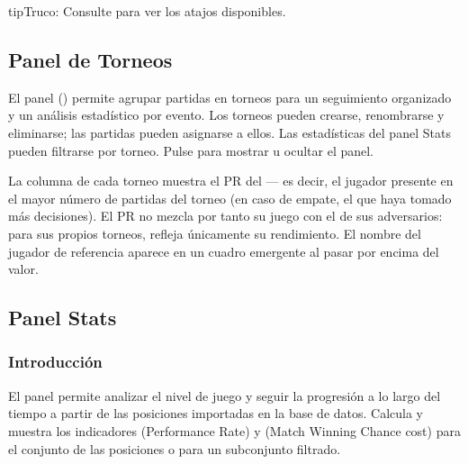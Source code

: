 \documentclass[letterpaper,10pt,spanish]{sphinxmanual}
\begin{document}
\begin{sphinxadmonition}{tip}{Truco:}
\sphinxAtStartPar
Consulte {\hyperref[\detokenize{raccourcis:raccourcis}]{}} para ver los atajos disponibles.
\end{sphinxadmonition}


\subsection{Panel de Torneos}
\label{\detokenize{manuel:panneau-tournois}}\label{\detokenize{manuel:id8}}
\sphinxAtStartPar
El panel  () permite agrupar partidas en torneos para un seguimiento organizado y un análisis estadístico por evento. Los torneos pueden crearse, renombrarse y eliminarse; las partidas pueden asignarse a ellos. Las estadísticas del panel Stats pueden filtrarse por torneo. Pulse  para mostrar u ocultar el panel.

\sphinxAtStartPar
La columna  de cada torneo muestra el PR del  — es decir, el jugador presente en el mayor número de partidas del torneo (en caso de empate, el que haya tomado más decisiones). El PR no mezcla por tanto su juego con el de sus adversarios: para sus propios torneos, refleja únicamente su rendimiento. El nombre del jugador de referencia aparece en un cuadro emergente al pasar por encima del valor.


\subsection{Panel Stats}
\label{\detokenize{manuel:panneau-stats}}\label{\detokenize{manuel:stats}}

\subsubsection{Introducción}
\label{\detokenize{manuel:id9}}
\sphinxAtStartPar
El panel  permite analizar el nivel de juego y seguir la progresión a lo largo del tiempo a partir de las posiciones importadas en la base de datos. Calcula y muestra los indicadores  (Performance Rate) y  (Match Winning Chance cost) para el conjunto de las posiciones o para un subconjunto filtrado.
\end{document}
